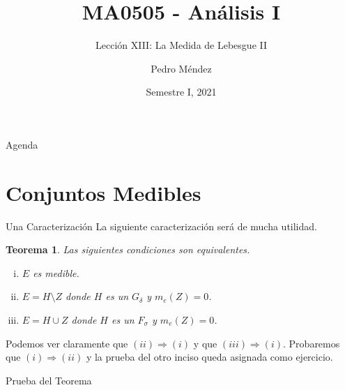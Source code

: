 \documentclass[utf8]{beamer}
\title[MA0505]{MA0505 - An\'alisis I}
\subtitle{Lecci\'on XIII: La Medida de Lebesgue II}
\author{Pedro M\'endez\inst{1}}
\institute[Universidad de Costa Rica] %
{
  \inst{1}%
  Departmento de Matem\'atica Pura y Ciencias Actuariales\\
  Universidad de Costa Rica
  }
\date[I-2021] {Semestre I, 2021}
\theoremstyle{plain}
\newtheorem{Th}{Teorema}               %
\theoremstyle{definition}
\theoremstyle{remark}
\numberwithin{equation}{section}
\newcommand{\dl}{\delta}                %
\newcommand{\sg}{\sigma}                %
\newcommand{\less}{\setminus}           %
\newcommand{\To}{\Rightarrow}
\renewcommand{\.}{\Cdot}                %
\begin{document}
\begin{frame}
  \titlepage
\end{frame}

\begin{frame}{Agenda}
  \tableofcontents
\end{frame}





\section{Conjuntos Medibles}

\begin{frame}{Una Caracterización}
  La siguiente caracterización será de mucha utilidad.
  \begin{Th}\label{th:caracMedibles}
    Las siguientes condiciones son equivalentes.
    \begin{enumerate}[(i)]
      \item $E$ es medible.
      \item $E=H\less Z$ donde $H$ es un $G_\dl$ y $m_e(Z)=0$.
      \item $E=H\cup Z$ donde $H$ es un $F_\sg$ y $m_e(Z)=0$.
    \end{enumerate}
  \end{Th}
  Podemos ver claramente que $(ii)\To (i)$ y que $(iii)\To (i)$. Probaremos que $(i)\To (ii)$ y la prueba del otro inciso queda asignada como \alert{ejercicio}.
\end{frame}

\begin{frame}{Prueba del Teorema}
  
\end{frame}
\end{document}
